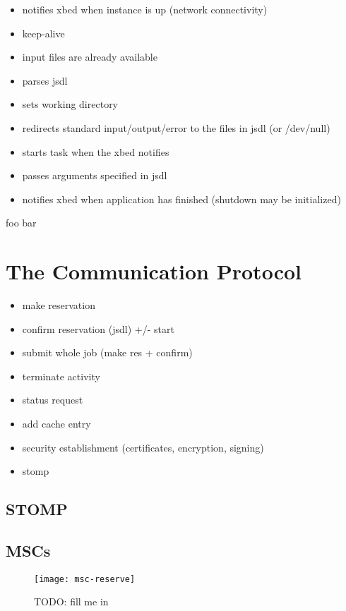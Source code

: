 \begin{itemize}
\item notifies xbed when instance is up (\ie network connectivity)
\item keep-alive
\item input files are already available
\item parses jsdl
\item sets working directory
\item redirects standard input/output/error to the files in jsdl (or /dev/null)
\item starts task when the xbed notifies
\item passes arguments specified in jsdl
\item notifies xbed when application has finished (shutdown may be initialized)
\end{itemize}
foo bar

\section{The Communication Protocol}
\label{sec:communication-protocol}

\begin{itemize}
\item make reservation
\item confirm reservation (jsdl) +/- start
\item submit whole job (make res + confirm)
\item terminate activity
\item status request
\item add cache entry
\item security establishment (certificates, encryption, signing)
\item stomp
\end{itemize}

\subsection{STOMP}
\label{sec:protocol:stomp}

\subsection{MSCs}

\begin{figure}[ht]
  \centering
  \texttt{[image: msc-reserve]}
  \caption[MSC Make Reservation]{TODO: fill me in}
  \label{fig:msc-reserve}
\end{figure}

